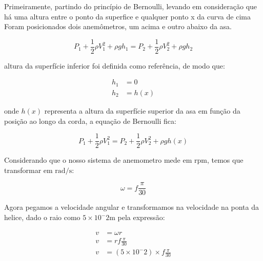 \documentclass[12pt]{article}
\begin{document}
Primeiramente, partindo do princípio de Bernoulli, levando em consideração que há uma altura entre o ponto da superfice e qualquer ponto x da curva de cima
Foram posicionados dois anemômetros, um acima e outro abaixo da asa.

\begin{equation}
\textbf{$P_1 + \frac{1}{2}\rho V_1^{2} + \rho g h_1 = P_2 + \frac{1}{2}\rho V_2^{2} + \rho g h_2$} 
\end{equation}

altura da superfície inferior foi definida como referência, de modo que:

\begin{align}
h_1 &= 0 \\
h_2 &= h(x)
\end{align}

onde $h(x)$ representa a altura da superfície superior da asa em função da posição ao longo da corda, a equação de Bernoulli fica:

\begin{equation}
\textbf{$P_1 + \frac{1}{2}\rho V_1^{2} = P_2 + \frac{1}{2}\rho V_2^{2} + \rho g h(x)$} 
\end{equation}

Considerando que o nosso sistema de anemometro mede em $\mathrm{rpm}$, temos que transformar em $\unit{\radian\per\second}$:

\begin{equation}
\textbf{$\omega = f\frac{\pi}{30}$} 
\end{equation}

Agora pegamos a velocidade angular e transformamos na velocidade na ponta da helice, dado o raio como $5 \times 10^-2 \unit{\metre}$ pela expressão:

\begin{align}
v &= \omega r \\
v &= rf\frac{\pi}{30} \\
v &= (5 \times 10^-2) \times f\frac{\pi}{30}
\end{align}

\end{document}
